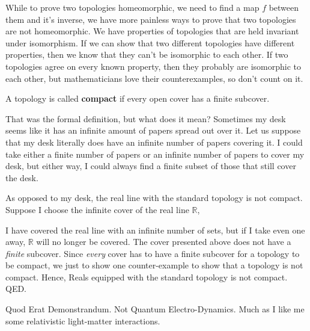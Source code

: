 While to prove two topologies homeomorphic, we need to find a map $f$ between them and it's inverse, we have more painless ways to prove that two topologies are not homeomorphic.  We have properties of topologies that are held invariant under isomorphism.  If we can show that two different topologies have different properties, then we know that they can't be isomorphic to each other.  If two topologies agree on every known property, then they probably are isomorphic to each other, but mathematicians love their counterexamples, so don't count on it.



\begin{definition}[Compact]
  A topology is called \textbf{compact} if every open cover has a finite subcover.
\end{definition}
That was the formal definition, but what does it mean?  Sometimes my desk seems like it has an infinite amount of papers spread out over it.  Let us suppose that my desk literally does have an infinite number of papers covering it.  I could take either a finite number of papers or an infinite number of papers to cover my desk, but either way, I could always find a finite subset of those that still cover the desk.

As opposed to my desk, the real line with the standard topology is not compact.  Suppose I choose the infinite cover of the real line $\mathbb{R}$,

\begin{center}
\end{center}

I have covered the real line with an infinite number of sets, but if I take even one away, $\mathbb{R}$ will no longer be covered.  The cover presented above does not have a \textit{finite} subcover.  Since \textit{every} cover has to have a finite subcover for a topology to be compact, we just to show one counter-example to show that a topology is not compact.  Hence, Reals equipped with the standard topology is not compact. QED.

Quod Erat Demonstrandum. Not Quantum Electro-Dynamics.  Much as I like me some relativistic light-matter interactions.

